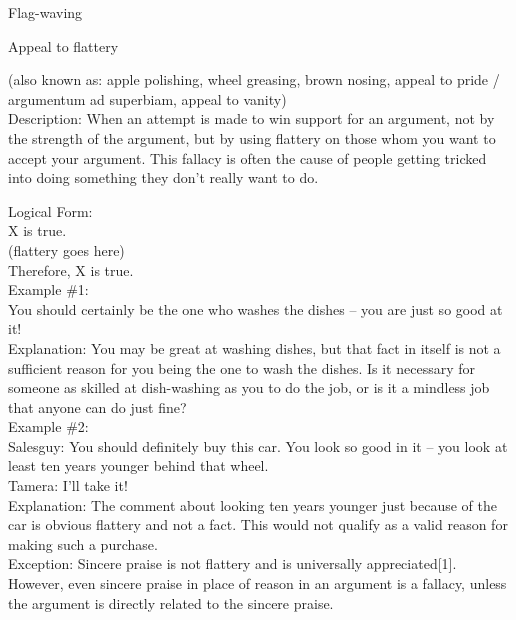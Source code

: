 \documentclass[a4paper,12pt,single,pdftex]{scrartcl}
\begin{document}
  

Flag-waving

Appeal to flattery
    
      (also known as: apple polishing, wheel greasing, brown nosing, appeal to pride / argumentum ad superbiam, appeal to vanity)
    \\

  
    Description: When an attempt is made to win support for an argument, not by the strength of the argument, but by using flattery on those whom you want to accept your argument.  This fallacy is often the cause of people getting tricked into doing something they don’t really want to do.

    
      Logical Form:
    \\

    
      X is true.
    \\

    
      (flattery goes here)
    \\

    
      Therefore, X is true.
    \\

    
      Example \#1:
    \\

    
      You should certainly be the one who washes the dishes -- you are just so good at it!
    \\

    
      Explanation: You may be great at washing dishes, but that fact in itself is not a sufficient reason for you being the one to wash the dishes.  Is it necessary for someone as skilled at dish-washing as you to do the job, or is it a mindless job that anyone can do just fine?
    \\

    
      Example \#2:
    \\

    
      Salesguy: You should definitely buy this car.  You look so good in it -- you look at least ten years younger behind that wheel.
    \\

    
      Tamera: I’ll take it!
    \\

    
      Explanation: The comment about looking ten years younger just because of the car is obvious flattery and not a fact.  This would not qualify as a valid reason for making such a purchase.
    \\

    
      Exception: Sincere praise is not flattery and is universally appreciated[1].  However, even sincere praise in place of reason in an argument is a fallacy, unless the argument is directly related to the sincere praise.
    \\
\end{document}
